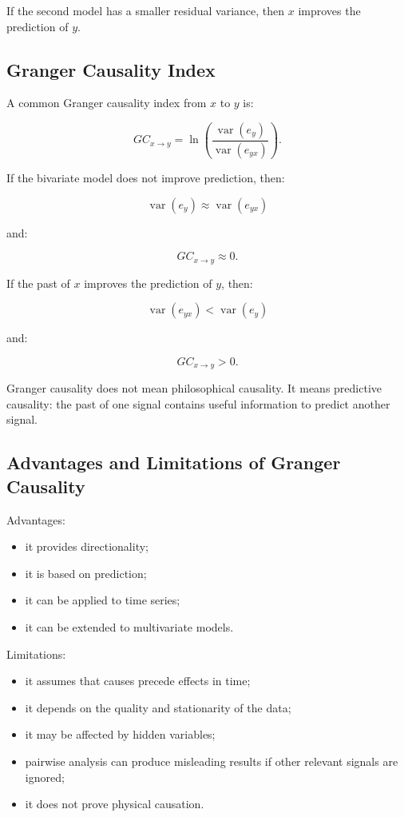 If the second model has a smaller residual variance, then $x$ improves the prediction of $y$.

\subsection{Granger Causality Index}

A common Granger causality index from $x$ to $y$ is:

\[
GC_{x \rightarrow y}
=
\ln
\left(
\frac{\operatorname{var}(e_y)}
{\operatorname{var}(e_{yx})}
\right).
\]

If the bivariate model does not improve prediction, then:

\[
\operatorname{var}(e_y)
\approx
\operatorname{var}(e_{yx})
\]

and:

\[
GC_{x \rightarrow y}
\approx 0.
\]

If the past of $x$ improves the prediction of $y$, then:

\[
\operatorname{var}(e_{yx})
<
\operatorname{var}(e_y)
\]

and:

\[
GC_{x \rightarrow y} > 0.
\]

\begin{authornote}
Granger causality does not mean philosophical causality. It means predictive causality: the past of one signal contains useful information to predict another signal.
\end{authornote}

\subsection{Advantages and Limitations of Granger Causality}

Advantages:

\begin{itemize}[noitemsep]
    \item it provides directionality;
    \item it is based on prediction;
    \item it can be applied to time series;
    \item it can be extended to multivariate models.
\end{itemize}

Limitations:

\begin{itemize}[noitemsep]
    \item it assumes that causes precede effects in time;
    \item it depends on the quality and stationarity of the data;
    \item it may be affected by hidden variables;
    \item pairwise analysis can produce misleading results if other relevant signals are ignored;
    \item it does not prove physical causation.
\end{itemize}

